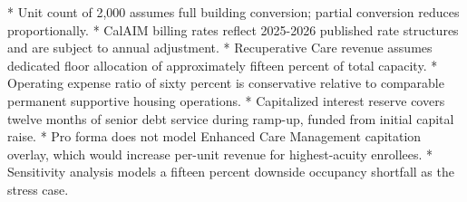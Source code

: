 \documentclass[12pt, letterpaper]{article}
\begin{document}
*   Unit count of 2,000 assumes full building conversion; partial conversion reduces proportionally.
*   CalAIM billing rates reflect 2025-2026 published rate structures and are subject to annual adjustment.
*   Recuperative Care revenue assumes dedicated floor allocation of approximately fifteen percent of total capacity.
*   Operating expense ratio of sixty percent is conservative relative to comparable permanent supportive housing operations.
*   Capitalized interest reserve covers twelve months of senior debt service during ramp-up, funded from initial capital raise.
*   Pro forma does not model Enhanced Care Management capitation overlay, which would increase per-unit revenue for highest-acuity enrollees.
*   Sensitivity analysis models a fifteen percent downside occupancy shortfall as the stress case.
\end{document}

